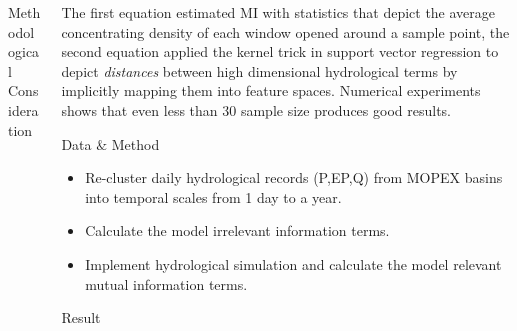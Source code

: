 \documentclass[final]{beamer}
\newlength{\onecolwid}
\begin{document}
\begin{frame}[t]
\begin{columns}[t]
\begin{column}{\onecolwid}
\begin{block}{Methodological Consideration}
\end{block}


 


\end{column} %
\begin{column}{\onecolwid} %

\begin{block}{}
The first equation estimated MI with statistics that depict the average concentrating density of each window opened around a sample point\cite{kraskov2004estimating}, the second equation applied the kernel trick in support vector regression to depict \emph{distances} between high dimensional hydrological terms by implicitly mapping them into feature spaces\cite{phdgong}. Numerical experiments shows that even less than 30 sample size produces good results\cite{kraskov2004estimating}.
\end{block}

\begin{block}{ Data $\&$ Method }

 \begin{itemize}
 \item Re-cluster daily hydrological records (P,EP,Q) from MOPEX basins into temporal scales from 1 day to a year.
 \item Calculate the  model irrelevant information terms.
 \item Implement hydrological simulation and calculate the model relevant mutual information terms.
 \end{itemize}
\end{block}

\begin{block}{Result}


\end{block}
\end{column}
\end{columns}
\end{frame}
\end{document}
